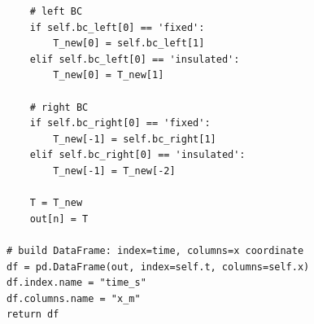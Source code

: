 \documentclass[12pt]{article}
\begin{document}
\begin{enumerate}
\begin{verbatim}
    # left BC
    if self.bc_left[0] == 'fixed':
        T_new[0] = self.bc_left[1]
    elif self.bc_left[0] == 'insulated':
        T_new[0] = T_new[1]

    # right BC
    if self.bc_right[0] == 'fixed':
        T_new[-1] = self.bc_right[1]
    elif self.bc_right[0] == 'insulated':
        T_new[-1] = T_new[-2]

    T = T_new
    out[n] = T

# build DataFrame: index=time, columns=x coordinate
df = pd.DataFrame(out, index=self.t, columns=self.x)
df.index.name = "time_s"
df.columns.name = "x_m"
return df
    \end{verbatim}
\end{enumerate}

\newpage
\renewcommand{\refname}{Izmantotā literatūra}
\nocite{*}


\end{document}
